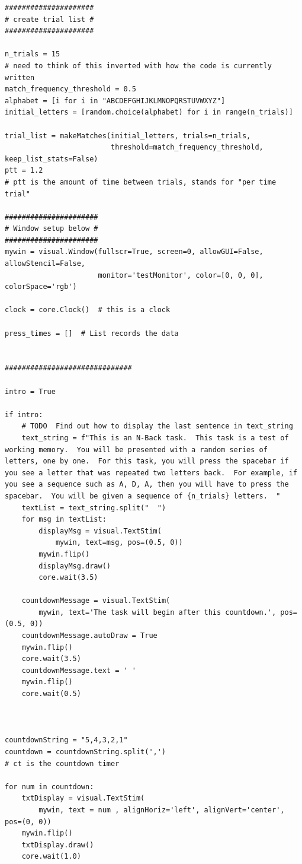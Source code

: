 \documentclass{article}
\begin{document}
\begin{verbatim}
#####################
# create trial list #
#####################

n_trials = 15
# need to think of this inverted with how the code is currently written
match_frequency_threshold = 0.5
alphabet = [i for i in "ABCDEFGHIJKLMNOPQRSTUVWXYZ"]
initial_letters = [random.choice(alphabet) for i in range(n_trials)]

trial_list = makeMatches(initial_letters, trials=n_trials,
                         threshold=match_frequency_threshold, keep_list_stats=False)
ptt = 1.2
# ptt is the amount of time between trials, stands for "per time trial"

######################
# Window setup below #
######################
mywin = visual.Window(fullscr=True, screen=0, allowGUI=False, allowStencil=False,
                      monitor='testMonitor', color=[0, 0, 0], colorSpace='rgb')

clock = core.Clock()  # this is a clock

press_times = []  # List records the data


##############################

intro = True

if intro:
    # TODO  Find out how to display the last sentence in text_string
    text_string = f"This is an N-Back task.  This task is a test of working memory.  You will be presented with a random series of letters, one by one.  For this task, you will press the spacebar if you see a letter that was repeated two letters back.  For example, if you see a sequence such as A, D, A, then you will have to press the spacebar.  You will be given a sequence of {n_trials} letters.  "
    textList = text_string.split("  ")
    for msg in textList:
        displayMsg = visual.TextStim(
            mywin, text=msg, pos=(0.5, 0))
        mywin.flip()
        displayMsg.draw()
        core.wait(3.5)

    countdownMessage = visual.TextStim(
        mywin, text='The task will begin after this countdown.', pos=(0.5, 0))
    countdownMessage.autoDraw = True
    mywin.flip()
    core.wait(3.5)
    countdownMessage.text = ' '
    mywin.flip()
    core.wait(0.5)



countdownString = "5,4,3,2,1"
countdown = countdownString.split(',')
# ct is the countdown timer

for num in countdown:
    txtDisplay = visual.TextStim(
        mywin, text = num , alignHoriz='left', alignVert='center', pos=(0, 0))
    mywin.flip()
    txtDisplay.draw()
    core.wait(1.0)



\end{verbatim}
\end{document}

